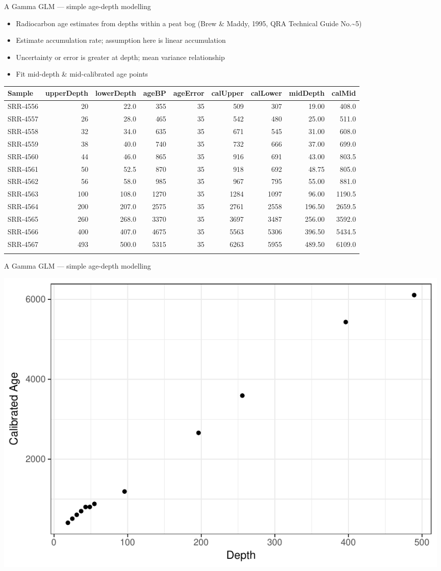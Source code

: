 \documentclass[10pt,ignorenonframetext,compress, aspectratio=169]{beamer}
\providecommand{\tightlist}{%
  \setlength{\itemsep}{0pt}\setlength{\parskip}{0pt}}
\begin{document}
\begin{frame}{A Gamma GLM --- simple age-depth modelling}

\begin{itemize}
\tightlist
\item
  Radiocarbon age estimates from depths within a peat bog (Brew \&
  Maddy, 1995, QRA Technical Guide No.\textasciitilde{}5)
\item
  Estimate accumulation rate; assumption here is linear accumulation
\item
  Uncertainty or error is greater at depth; mean variance relationship
\item
  Fit mid-depth \& mid-calibrated age points
\end{itemize}

\scriptsize

\begin{longtable}[]{@{}lrrrrrrrr@{}}
\toprule
Sample & upperDepth & lowerDepth & ageBP & ageError & calUpper &
calLower & midDepth & calMid\tabularnewline
\midrule
\endhead
SRR-4556 & 20 & 22.0 & 355 & 35 & 509 & 307 & 19.00 &
408.0\tabularnewline
SRR-4557 & 26 & 28.0 & 465 & 35 & 542 & 480 & 25.00 &
511.0\tabularnewline
SRR-4558 & 32 & 34.0 & 635 & 35 & 671 & 545 & 31.00 &
608.0\tabularnewline
SRR-4559 & 38 & 40.0 & 740 & 35 & 732 & 666 & 37.00 &
699.0\tabularnewline
SRR-4560 & 44 & 46.0 & 865 & 35 & 916 & 691 & 43.00 &
803.5\tabularnewline
SRR-4561 & 50 & 52.5 & 870 & 35 & 918 & 692 & 48.75 &
805.0\tabularnewline
SRR-4562 & 56 & 58.0 & 985 & 35 & 967 & 795 & 55.00 &
881.0\tabularnewline
SRR-4563 & 100 & 108.0 & 1270 & 35 & 1284 & 1097 & 96.00 &
1190.5\tabularnewline
SRR-4564 & 200 & 207.0 & 2575 & 35 & 2761 & 2558 & 196.50 &
2659.5\tabularnewline
SRR-4565 & 260 & 268.0 & 3370 & 35 & 3697 & 3487 & 256.00 &
3592.0\tabularnewline
SRR-4566 & 400 & 407.0 & 4675 & 35 & 5563 & 5306 & 396.50 &
5434.5\tabularnewline
SRR-4567 & 493 & 500.0 & 5315 & 35 & 6263 & 5955 & 489.50 &
6109.0\tabularnewline
\normalsize & & & & & & & &\tabularnewline
\bottomrule
\end{longtable}

\end{frame}

\begin{frame}{A Gamma GLM --- simple age-depth modelling}

\begin{center}\includegraphics[width=0.7\linewidth]{01-glms_files/figure-beamer/plot-maddy-1} \end{center}

\end{frame}
\end{document}

